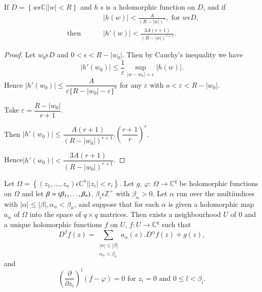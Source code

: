 \begin{lemma}\label{chap3:sec3:lem3}%
  If $D =\left\{ w \epsilon \mathbb{C} \big| |w| < R\right\}$ and
  $h$ s is a holomorphic function on $D$, and if 
  \begin{align*}
    & \left| h (w) \right| < \frac{A}{(R-|w|)^r}, \text{ for } w
    \epsilon D,\\ 
    \text{ then }  \qquad & \left| h' (w) \right| < \frac{3A (r+1)}
         {(R-|w|)^{r+1}}. 
  \end{align*}
\end{lemma}

\begin{proof}
  Let $w_0 \epsilon D$ and $0 <\epsilon < R- |w_0|$. Then by
  Cauchy's inequality we have 
  $$
  \left| h'(w_0) \right| \le \frac{1}{\varepsilon} \sup_{|w-w_0| =
    \varepsilon} \left|  h (w)\right|. 
  $$
  Hence $ \left| h'(w_0) \right| \le \dfrac{A}{\varepsilon \{R - |w_0|
    -\varepsilon\}^r}$ for any $\varepsilon$ with $o < \varepsilon <
  R-|w_0|$. 

  Take $\varepsilon = \dfrac {R-|w_0|} {r+1}$.

  Then $\left| h'(w_0) \right| \le \dfrac{A (r+1)} {(R-|w_0|)^{r+1}}
  . \left(\dfrac{r+1}{r}\right)^r$. 
  
  Hence\pageoriginale $\left| h'(w_0) \right| <  \dfrac {3 A (r+1)} {(R -|w_0|)^{r+1}}$.
\end{proof}

\begin{theorem*}%
  Let $\Omega = \left\{ (z_1 ,\ldots, z_n) \epsilon \mathbb{C}^n
  \Big| |z_i| < r_i\right\}$. Let $g$, $\varphi$: $\Omega \to
  \mathbb{C}^q$ be holomorphic functions on $\Omega$ and let $\beta =
  (\beta_1 ,\ldots,\break \beta_n)$, $\beta_i \epsilon \mathbb{Z}^+$ with
  $\beta_n > 0$. Let $\alpha$ run over the multiindices with $|\alpha|
  \le |\beta|, \alpha_n < \beta_n$, and suppose that for each $\alpha$
  is given a holomorphic map $a_\alpha$ of $\Omega$ into the space of
  $q \times q$ matrices. Then exists a neighbourhood $U$ of $0$ and a
  unique holomorphic functions $f$ on $U$, $f : U \to \mathbb{C}^q$
  such that 
  \begin{equation}
    D^\beta f (z) = \sum_{\substack{|\alpha|\le|\beta|\\ \alpha_n <
        \beta_n}} a_\alpha (z). D^\alpha f (z) + g
    (z),\tag{3.1}\label{chap3:sec3:eq3.1}  
  \end{equation}
  and
  \begin{equation}
    \left(\frac{\partial} {\partial z_i}\right)^l (f-\varphi) = 0 \text{ for }
    z_i = 0 \text{ and } 0 \le l < \beta_i.\tag{3.2}\label{chap3:sec3:eq3.2} 
  \end{equation}
\end{theorem*}

